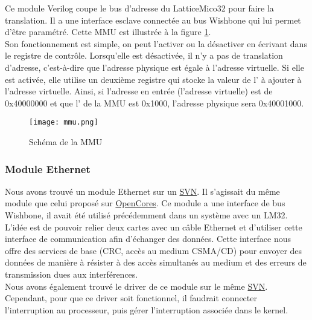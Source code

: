 Ce module Verilog coupe le bus d'adresse du LatticeMico32 pour faire la translation. Il a une interface esclave connectée au bus Wishbone qui lui permet d'être paramétré. Cette MMU est illustrée à la figure \ref{memory-management-unit}.\\
Son fonctionnement est simple, on peut l'activer ou la désactiver en écrivant dans le registre de contrôle. Lorsqu'elle est désactivée, il n'y a pas de translation d'adresse, c'est-à-dire que l'adresse physique est égale à l'adresse virtuelle. Si elle est activée, elle
utilise un deuxième registre qui stocke la valeur de l' à ajouter à l'adresse virtuelle. Ainsi, si l'adresse en entrée (l'adresse virtuelle) est de 0x40000000 et que l' de la MMU est 0x1000, l'adresse physique sera 0x40001000.

\begin{figure}[h!]
\centering
\texttt{[image: mmu.png]}
\caption{Schéma de la MMU}
\label{memory-management-unit}
\end{figure}

\subsubsection{Module Ethernet}

Nous avons trouvé un module Ethernet sur un \href{http://svn.ohwr.org/lm32/cores/mac/rtl/}{SVN}. Il s'agissait du même module que celui proposé sur \href{http://opencores.org/project,ethmac}{OpenCores}. Ce module a une interface de bus Wishbone, il avait été utilisé précédemment dans un système avec un LM32. L'idée est de pouvoir relier deux cartes avec un câble Ethernet et d'utiliser cette interface de communication afin d'échanger des données. Cette interface nous offre des services de base (CRC, accès au medium CSMA/CD) pour envoyer des données de manière à résister à des accès simultanés au medium et des erreurs de transmission dues aux interférences.\\

Nous avons également trouvé le driver de ce module sur le même \href{http://svn.ohwr.org/lm32/crt/mac/}{SVN}. Cependant, pour que ce driver soit fonctionnel, il faudrait connecter l'interruption au processeur, puis gérer l'interruption associée dans le kernel.
